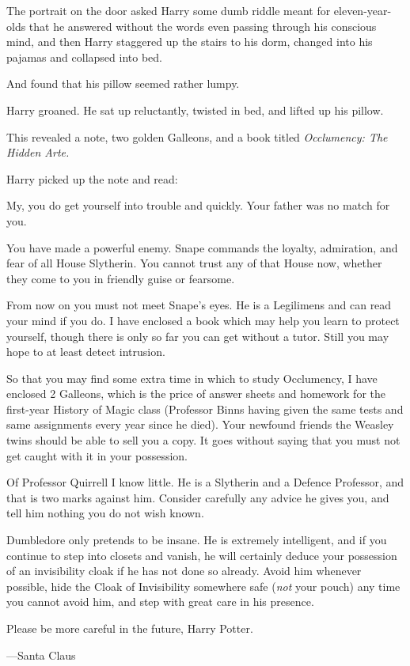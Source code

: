 The portrait on the door asked Harry some dumb riddle meant for
eleven-year-olds that he answered without the words even passing through his conscious mind, and then Harry staggered up the stairs to his dorm, changed into his pajamas and collapsed into bed.

And found that his pillow seemed rather lumpy.

Harry groaned. He sat up reluctantly, twisted in bed, and lifted up his pillow.

This revealed a note, two golden Galleons, and a book titled \emph{Occlumency: The Hidden Arte.}

Harry picked up the note and read:

\begin{writtenNote}
My, you do get yourself into trouble and quickly. Your father was no match for you.

You have made a powerful enemy. Snape commands the loyalty, admiration, and fear of all House Slytherin. You cannot trust any of that House now, whether they come to you in friendly guise or fearsome.

From now on you must not meet Snape’s eyes. He is a Legilimens and can read your mind if you do. I have enclosed a book which may help you learn to protect yourself, though there is only so far you can get without a tutor. Still you may hope to at least detect intrusion.

So that you may find some extra time in which to study Occlumency, I have enclosed 2 Galleons, which is the price of answer sheets and homework for the first-year History of Magic class (Professor Binns having given the same tests and same assignments every year since he died). Your newfound friends the Weasley twins should be able to sell you a copy. It goes without saying that you must not get caught with it in your possession.

Of Professor Quirrell I know little. He is a Slytherin and a Defence Professor, and that is two marks against him. Consider carefully any advice he gives you, and tell him nothing you do not wish known.

Dumbledore only pretends to be insane. He is extremely intelligent, and if you continue to step into closets and vanish, he will certainly deduce your possession of an invisibility cloak if he has not done so already. Avoid him whenever possible, hide the Cloak of Invisibility somewhere safe (\emph{not} your pouch) any time you cannot avoid him, and step with great care in his presence.

Please be more careful in the future, Harry Potter.

—Santa Claus
\end{writtenNote}

